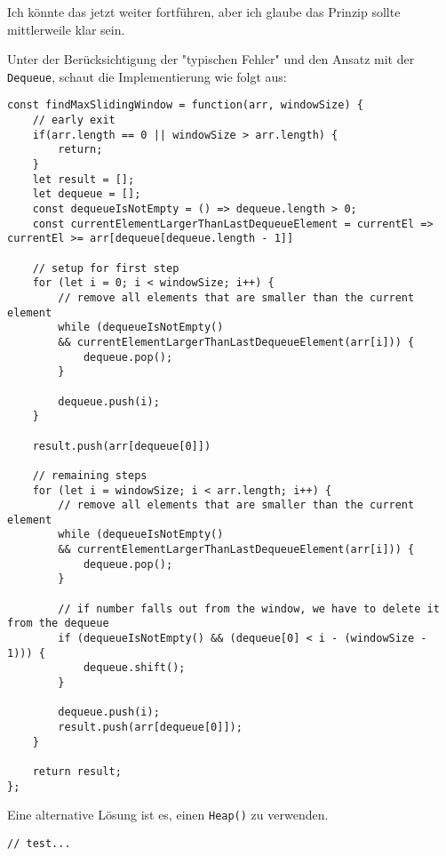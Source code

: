 \documentclass{book}
\begin{document}
Ich könnte das jetzt weiter fortführen, aber ich glaube das Prinzip sollte mittlerweile klar sein.

Unter der Berücksichtigung der "typischen Fehler" und den Ansatz mit der \lstinline|Dequeue|, schaut die Implementierung wie folgt aus:

\begin{lstlisting}[caption=My Javascript Example]
const findMaxSlidingWindow = function(arr, windowSize) {  
	// early exit
	if(arr.length == 0 || windowSize > arr.length) {
		return;
	}
	let result = [];
	let dequeue = [];
	const dequeueIsNotEmpty = () => dequeue.length > 0;
	const currentElementLargerThanLastDequeueElement = currentEl => currentEl >= arr[dequeue[dequeue.length - 1]]
	
	// setup for first step
	for (let i = 0; i < windowSize; i++) {
		// remove all elements that are smaller than the current element
		while (dequeueIsNotEmpty() 
		&& currentElementLargerThanLastDequeueElement(arr[i])) {
			dequeue.pop();
		}
		
		dequeue.push(i);
	}
	
	result.push(arr[dequeue[0]])
	
	// remaining steps  
	for (let i = windowSize; i < arr.length; i++) {
		// remove all elements that are smaller than the current element
		while (dequeueIsNotEmpty() 
		&& currentElementLargerThanLastDequeueElement(arr[i])) {
			dequeue.pop();
		}
		
		// if number falls out from the window, we have to delete it from the dequeue
		if (dequeueIsNotEmpty() && (dequeue[0] < i - (windowSize - 1))) {
			dequeue.shift();
		}
		
		dequeue.push(i);
		result.push(arr[dequeue[0]]);
	}
	
	return result;
};
\end{lstlisting}

Eine alternative Lösung ist es, einen \lstinline|Heap()| zu verwenden.
\medskip
\begin{lstlisting}[caption=My Javascript Example]
// test...

\end{lstlisting}
\end{document}
